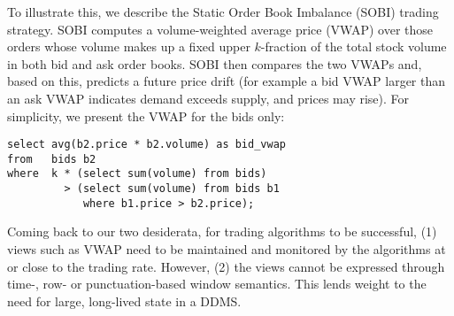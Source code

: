 To illustrate this, we describe the Static Order Book Imbalance (SOBI) trading
strategy. SOBI computes a volume-weighted average price (VWAP) over those orders
whose volume makes up a fixed upper $k$-fraction of the total stock volume in
both bid and ask order books. SOBI then compares the two VWAPs and, based on
this, predicts a future price drift (for example a bid VWAP larger than an ask
VWAP indicates demand exceeds supply, and prices may rise). For simplicity, we
present the VWAP for the bids only:



\begin{verbatim}
select avg(b2.price * b2.volume) as bid_vwap
from   bids b2
where  k * (select sum(volume) from bids)
         > (select sum(volume) from bids b1
            where b1.price > b2.price);
\end{verbatim}


Coming back to our two desiderata, for trading algorithms to be successful, (1)
views such as VWAP need to be maintained and monitored by the algorithms at or
close to the trading rate. However, (2) the views cannot be expressed through
time-, row- or punctuation-based window semantics.
This lends weight to the need for large, long-lived state in a DDMS.




